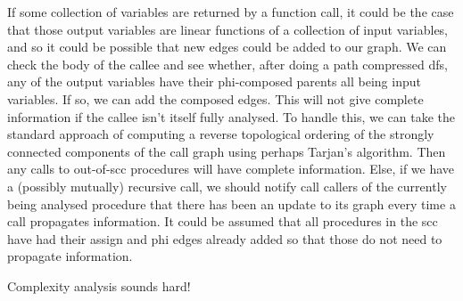 \documentclass{article}
\begin{document}
If some collection of variables are returned by a function call, it could be the case that those output variables are linear functions of a collection of input variables, and so it could be possible that new edges could be added to our graph.
We can check the body of the callee and see whether, after doing a path compressed dfs, any of the output variables have their phi-composed parents all being input variables.
If so, we can add the composed edges.
This will not give complete information if the callee isn't itself fully analysed.
To handle this, we can take the standard approach of computing a reverse topological ordering of the strongly connected components of the call graph using perhaps Tarjan's algorithm.
Then any calls to out-of-scc procedures will have complete information.
Else, if we have a (possibly mutually) recursive call, we should notify call callers of the currently being analysed procedure that there has been an update to its graph every time a call propagates information.
It could be assumed that all procedures in the scc have had their assign and phi edges already added so that those do not need to propagate information.

Complexity analysis sounds hard!



\end{document}
